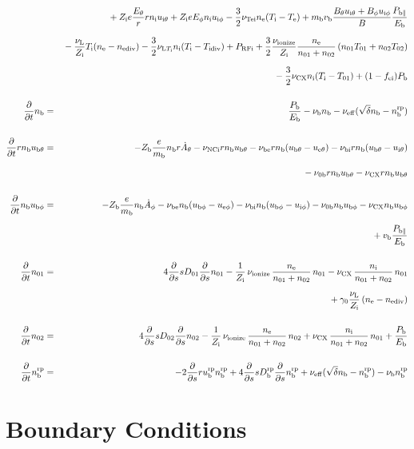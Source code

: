 \documentclass[11pt]{article}
\def\r#1{{\rm#1}}
\def\ddt{\frac{\partial}{\partial t}}
\def\dds{\frac{\partial}{\partial s}}
\def\mb{m_\r{b}}
\def\ne{n_\r{e}}
\def\ni{n_\r{i}}
\def\nb{n_\r{b}}
\def\ueth{u_{\r{e}\theta}}
\def\uith{u_{\r{i}\theta}}
\def\ubth{u_{\r{b}\theta}}
\def\ueph{u_{\r{e}\phi}}
\def\uiph{u_{\r{i}\phi}}
\def\ubph{u_{\r{b}\phi}}
\def\Eth{E_\theta}
\def\Eph{E_\phi}
\def\Bth{B_\theta}
\def\Bph{B_\phi}
\def\Athd{\dot{A}_\theta}
\def\Aphd{\dot{A}_\phi}
\def\Te{T_\r{e}}
\def\Ti{T_\r{i}}
\def\nna{n_{01}}
\def\nnb{n_{02}}
\def\Zi{Z_\r{i}}
\def\Zb{Z_\r{b}}
\def\Pb{P_\r{b}}
\def\Eb{E_\r{b}}
\def\PRFi{P_\r{RFi}}
\def\Tna{T_{01}}
\def\Tnb{T_{02}}
\def\fei{f_\r{ei}}
\def\nbrp{n_\r{b}^\r{rp}}
\def\Pbpara{P_{\r{b}\parallel}}
\def\nueff{\nu_\r{eff}}
\def\ubrp{u_\r{b}^\r{rp}}
\def\Dbrp{D_\r{b}^\r{rp}}
\def\nuNCi{\nu_\r{NCi}}
\def\nube{\nu_\r{be}}
\def\nubi{\nu_\r{bi}}
\def\nunb{\nu_\r{0b}}
\def\nuL{\nu_\r{L}}
\def\nuCX{\nu_\r{CX}}
\def\nuion{\nu_\r{ionize}}
\def\nub{\nu_\r{b}}
\def\nuTei{\nu_\r{Tei}}
\def\vb{v_\r{b}}
\def\nediv{n_\r{ediv}}
\def\Tidiv{T_\r{idiv}}
\def\nuLTi{\nu_{\r{L}T_\r{i}}}
\begin{document}
\begin{eqnarray}
%
\nonumber\\[2.5mm]&&{}
%
  + \Zi e \frac{\Eth}{r} r \ni \uith
%
  + \Zi e \Eph \ni \uiph
%
  - \frac{3}{2} \nuTei \ne (\Ti - \Te)
%
  + \mb \vb \frac{\Bth \uith + \Bph \uiph}{B} \frac{\Pbpara}{\Eb}  
\nonumber\\[2.5mm]&&{}
%
  - \frac{\nuL}{\Zi} \Ti (\ne - \nediv)
%
  - \frac{3}{2} \nuLTi \ni (\Ti - \Tidiv)
%
  + \PRFi
%
  + \frac{3}{2} \frac{\nuion}{\Zi} \frac{\ne}{\nna +\nnb}\, (\nna \Tna +
  \nnb \Tnb)
\nonumber\\[2.5mm]&&{}
%
  - \frac{3}{2} \nuCX \ni (\Ti - \Tna)
%
  + (1 - \fei) \Pb
\\[5mm]
%
%
  \ddt \nb &=&
%
    \frac{\Pb}{\Eb}
%
  - \nub \nb
%
  - \nueff (\sqrt{\delta}\nb - \nbrp)
\\[5mm]
%
%
  \ddt r \nb \ubth &=&
%
  - \Zb \frac{e}{\mb} \nb r \Athd
%
  - \nuNCi r \nb \ubth
%
  - \nube r \nb (\ubth - \ueth)
%
  - \nubi r \nb (\ubth - \uith)
\nonumber\\[2.5mm]&&{}
%
  - \nunb r \nb \ubth
%
  - \nuCX r \nb \ubth
\\[5mm]
%
%
  \ddt \nb \ubph &=&
%
  - \Zb \frac{e}{\mb} \nb \Aphd
%
  - \nube \nb (\ubph - \ueph)
%
  - \nubi \nb (\ubph - \uiph)
%
  - \nunb \nb \ubph
%
  - \nuCX \nb \ubph
\nonumber\\[2.5mm]&&{}
%
  + \vb \frac{\Pbpara}{\Eb}
\\[5mm]
%
%
  \ddt \nna &=& 
%
    4 \dds s D_{01} \dds \nna
%
  - \frac{1}{\Zi}\, \nuion\, \frac{\ne}{\nna+\nnb}\, \nna
%
  - \nuCX\, \frac{\ni}{\nna+\nnb}\, \nna
\nonumber\\[2.5mm]&&{}
%
  + \gamma_0 \frac{\nuL}{\Zi} \, (\ne - \nediv)
\\[5mm]
%
%
  \ddt \nnb &=& 
%
    4 \dds s D_{02} \dds \nnb
%
  - \frac{1}{\Zi}\, \nuion\, \frac{\ne}{\nna+\nnb}\, \nnb
%
  + \nuCX\, \frac{\ni}{\nna+\nnb}\, \nna
%
  + \frac{\Pb}{\Eb}
\\[5mm]
%
%
  \ddt \nbrp &=&
%
  - 2 \dds r \ubrp \nbrp + 4 \dds s \Dbrp \dds \nbrp
%
  + \nueff (\sqrt{\delta} \nb - \nbrp)
%
  - \nub \nbrp
%
\end{eqnarray}

\bigskip

\section{Boundary Conditions}
\end{document}
